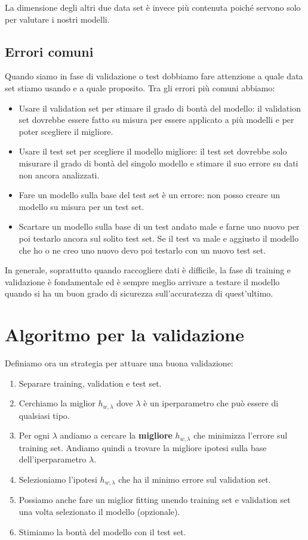 La dimensione degli altri due data set \`e invece pi\`u contenuta poich\'e servono solo per valutare i nostri modelli.

\subsection{Errori comuni}
Quando siamo in fase di validazione o test dobbiamo fare attenzione a quale data set stiamo usando e a quale proposito. Tra
gli errori pi\`u comuni abbiamo:
\begin{itemize}
	\item Usare il validation set per stimare il grado di bont\`a del modello: il validation set dovrebbe essere fatto
	      su misura per essere applicato a pi\`u modelli e per poter scegliere il migliore.
	\item Usare il test set per scegliere il modello migliore: il test set dovrebbe solo misurare il grado di bont\`a del
	      singolo modello e stimare il suo errore su dati non ancora analizzati.
	\item Fare un modello sulla base del test set \`e un errore: non posso creare un modello su misura per un test set.
	\item Scartare un modello sulla base di un test andato male e farne uno nuovo per poi testarlo ancora sul solito test
	      set. Se il test va male e aggiusto il modello che ho o ne creo uno nuovo devo poi testarlo con un nuovo test set.
\end{itemize}
In generale, soprattutto quando raccogliere dati \`e difficile, la fase di training e validazione \`e fondamentale ed \`e
sempre meglio arrivare a testare il modello quando si ha un buon grado di sicurezza sull'accuratezza di quest'ultimo.

\section{Algoritmo per la validazione}
Definiamo ora un strategia per attuare una buona validazione:
\begin{enumerate}
	\item Separare training, validation e test set.
	\item Cerchiamo la miglior $h_{w, \lambda}$ dove $\lambda$ \`e un iperparametro che pu\`o essere di qualsiasi tipo.
	\item Per ogni $\lambda$ andiamo a cercare la \textbf{migliore} $h_{w, \lambda}$ che minimizza l'errore sul training set.
	      Andiamo quindi a trovare la migliore ipotesi sulla base dell'iperparametro $\lambda$.
	\item Selezioniamo l'ipotesi $h_{w, \lambda}$ che ha il minimo errore sul validation set.
	\item Possiamo anche fare un miglior fitting unendo training set e validation set una volta selezionato il modello
	      (opzionale).
	\item Stimiamo la bont\`a del modello con il test set.
\end{enumerate}

